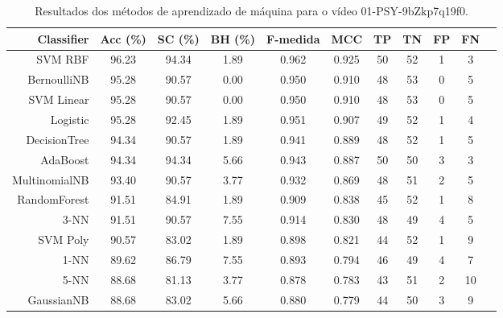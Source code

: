 \begin{table}[!htb]
\centering
\caption{Resultados dos métodos de aprendizado de máquina para o vídeo 01-PSY-9bZkp7q19f0.}
\label{tab:01-PSY-9bZkp7q19f0}
\begin{tabular}{r|c|c|c|c|c|c|c|c|c|c}
\hline\hline
Classifier & Acc (\%) & SC (\%) & BH (\%) & F-medida & MCC & TP & TN & FP & FN \\ \hline
SVM RBF & 96.23 & 94.34 & 1.89 & 0.962 & 0.925 & 50 & 52 & 1 & 3 \\ 
BernoulliNB & 95.28 & 90.57 & 0.00 & 0.950 & 0.910 & 48 & 53 & 0 & 5 \\ 
SVM Linear & 95.28 & 90.57 & 0.00 & 0.950 & 0.910 & 48 & 53 & 0 & 5 \\ 
Logistic & 95.28 & 92.45 & 1.89 & 0.951 & 0.907 & 49 & 52 & 1 & 4 \\ 
DecisionTree & 94.34 & 90.57 & 1.89 & 0.941 & 0.889 & 48 & 52 & 1 & 5 \\ 
AdaBoost & 94.34 & 94.34 & 5.66 & 0.943 & 0.887 & 50 & 50 & 3 & 3 \\ 
MultinomialNB & 93.40 & 90.57 & 3.77 & 0.932 & 0.869 & 48 & 51 & 2 & 5 \\ 
RandomForest & 91.51 & 84.91 & 1.89 & 0.909 & 0.838 & 45 & 52 & 1 & 8 \\ 
3-NN & 91.51 & 90.57 & 7.55 & 0.914 & 0.830 & 48 & 49 & 4 & 5 \\ 
SVM Poly & 90.57 & 83.02 & 1.89 & 0.898 & 0.821 & 44 & 52 & 1 & 9 \\ 
1-NN & 89.62 & 86.79 & 7.55 & 0.893 & 0.794 & 46 & 49 & 4 & 7 \\ 
5-NN & 88.68 & 81.13 & 3.77 & 0.878 & 0.783 & 43 & 51 & 2 & 10 \\ 
GaussianNB & 88.68 & 83.02 & 5.66 & 0.880 & 0.779 & 44 & 50 & 3 & 9 \\ 
\hline\hline
\end{tabular}
\end{table}
